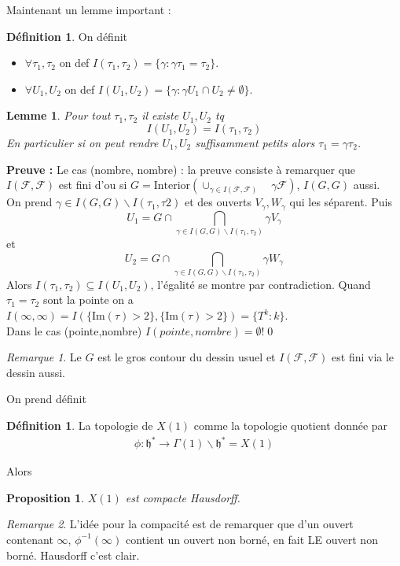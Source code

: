 \documentclass[12pt]{article}
\theoremstyle{plain}
\newtheorem{lem}[subsubsection]{Lemme}
\newtheorem{prop}[subsubsection]{Proposition}
\theoremstyle{definition}
\newtheorem{defn}[subsubsection]{D\'efinition}
\theoremstyle{remark}
\newtheorem{rem}{Remarque}
\newcommand{\h}{\mathfrak{h}}
\newcommand{\F}{\mathcal{F}}
\begin{document}
\newpage
Maintenant un lemme important : 
\begin{defn}
    On définit
    \begin{itemize}
        \item $\forall\tau_1,\tau_2$ on def $I(\tau_1,\tau_2)=\{\gamma : \gamma\tau_1=\tau_2\}$.
        \item $\forall U_1,U_2$ on def $I(U_1,U_2)=\{\gamma : \gamma U_1\cap U_2\ne\emptyset\}$.
    \end{itemize}
\end{defn}
\begin{lem}
    Pour tout $\tau_1,\tau_2$ il existe $U_1,U_2$ tq $$I(U_1,U_2)=I(\tau_1,\tau_2)$$
    En particulier si on peut rendre $U_1,U_2$ suffisamment petits alors $\tau_1=\gamma \tau_2$.
\end{lem}
\textbf{Preuve :} Le cas (nombre, nombre) : la preuve consiste à remarquer que $I(\F,\F)$ est fini d'ou si $G=\text{Interior}\left(\cup_{\gamma\in I(\F,\F)}\quad \gamma\F\right)$,
$I(G,G)$ aussi. \\ \indent On prend $\gamma\in I(G,G)\backslash I(\tau_1,\tau2)$ et des ouverts $V_{\gamma}, W_{\gamma}$ qui les séparent. 
Puis $$U_1=G\cap \bigcap_{\gamma\in I(G,G)\backslash I(\tau_1,\tau_2)} \gamma V_{\gamma}$$ et $$U_2=G\cap \bigcap_{\gamma\in I(G,G)\backslash I(\tau_1,\tau_2)} \gamma W_{\gamma}$$
Alors $I(\tau_1,\tau_2)\subseteq I(U_1,U_2)$, l'égalité se montre par contradiction. Quand $\tau_1=\tau_2$ sont la pointe on a $I(\infty,\infty)=I(\{\text{Im}(\tau)>2\},\{\text{Im}(\tau)>2\})=\{T^k:k\}$.\\
\indent Dans le cas (pointe,nombre) $I(pointe,nombre)=\emptyset$!\qed

\begin{rem}
    Le $G$ est le gros contour du dessin usuel et $I(\F,\F)$ est fini via le dessin aussi.
\end{rem}

On prend définit
\begin{defn}
    La topologie de $X(1)$ comme la topologie quotient donnée par 
    \begin{align*}
        \phi : \h^*\rightarrow \Gamma(1)\backslash \h^*=X(1)
    \end{align*}
\end{defn}

\noindent Alors 
\begin{prop}
    $X(1)$ est compacte Hausdorff.
\end{prop}

\begin{rem}
    L'idée pour la compacité est de remarquer que d'un ouvert contenant $\infty$, $\phi^{-1}(\infty)$ contient un ouvert non borné, en fait LE ouvert non borné.
    Hausdorff c'est clair.
\end{rem}
\end{document}
